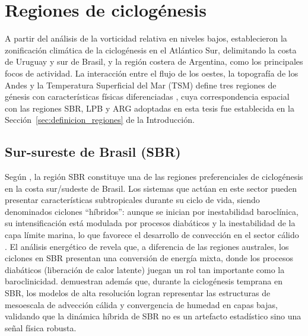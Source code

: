 
\section{Regiones de ciclogénesis}\label{sec:tb_regiones}

A partir del análisis de la vorticidad relativa en niveles bajos, \citet{reboita2010south} establecieron la zonificación climática de la ciclogénesis en el Atlántico Sur, delimitando la costa de Uruguay y sur de Brasil, y la región costera de Argentina, como los principales focos de actividad. La interacción entre el flujo de los oestes, la topografía de los Andes y la Temperatura Superficial del Mar (TSM) define tres regiones de génesis con características físicas diferenciadas \citep{gramcianinov2019properties}, cuya correspondencia espacial con las regiones SBR, LPB y ARG adoptadas en esta tesis fue establecida en la Sección~\ref{sec:definicion_regiones} de la Introducción.

\subsection{Sur-sureste de Brasil (SBR)}\label{subsec:tb_sbr}

Según \citet{reboita2022from}, la región SBR constituye una de las regiones preferenciales de ciclogénesis en la costa sur/sudeste de Brasil. Los sistemas que actúan en este sector pueden presentar características subtropicales durante su ciclo de vida, siendo denominados ciclones ``híbridos'': aunque se inician por inestabilidad baroclínica, su intensificación está modulada por procesos diabáticos y la inestabilidad de la capa límite marina, lo que favorece el desarrollo de convección en el sector cálido \citep{marrafon2022classificacao}. El análisis energético de \citet{coutodesouza2024thesis} revela que, a diferencia de las regiones australes, los ciclones en SBR presentan una conversión de energía mixta, donde los procesos diabáticos (liberación de calor latente) juegan un rol tan importante como la baroclinicidad. \citet{gramcianinov2024early} demuestran además que, durante la ciclogénesis temprana en SBR, los modelos de alta resolución logran representar las estructuras de mesoescala de advección cálida y convergencia de humedad en capas bajas, validando que la dinámica híbrida de SBR no es un artefacto estadístico sino una señal física robusta.

